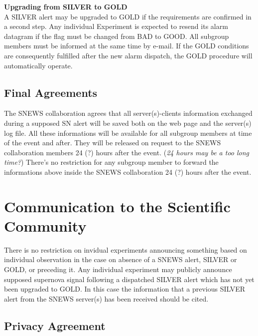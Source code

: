 \documentclass{article}
\begin{document}
\textbf{Upgrading from SILVER to GOLD}\\
A SILVER alert may be upgraded to GOLD if the requirements are
confirmed in a second step. Any individual Experiment is expected to
resend its alarm datagram if the flag must be changed from BAD to
GOOD. All subgroup members must be informed at the same time by
e-mail. If the GOLD conditions are consequently fulfilled after the
new alarm dispatch, the GOLD procedure will automatically operate.

\subsection{Final Agreements}

The SNEWS collaboration agrees that all server(s)-clients information
exchanged during a supposed SN alert will be saved both on the web page
and the server(s) log file. All these informations will be available
for all subgroup members at time of the event and after. They will be
released on request to the SNEWS collaboration members 24 (?) hours
after the event.  ({\it 24 hours may be a too long time?})  There's no
restriction for any subgroup member to forward the informations above
inside the SNEWS collaboration 24 (?) hours after the event.


\section{Communication to the Scientific Community}
There is no restriction on invidual experiments announcing something
based on individual observation in the case on absence of a SNEWS
alert, SILVER or GOLD, or preceding it.  Any individual experiment may
publicly announce supposed supernova signal following a dispatched 
SILVER alert which has not yet been upgraded to GOLD.  In this case 
the information that a previous SILVER alert from the
SNEWS server(s) has been received should be cited.
                                         
\subsection{Privacy Agreement}
                                     
\end{document}
